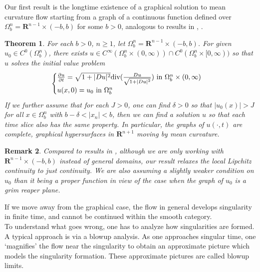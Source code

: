 \documentclass[pdflatex,sn-mathphys-num]{sn-jnl}%
\newtheorem{theorem}{Theorem}[section]
\newtheorem{remark}[theorem]{Remark}
\begin{document}
Our first result is the longtime existence of a graphical solution to mean curvature flow starting from a graph of a continuous function defined over $\Omega^n_b = \mathbf{R}^{n-1}\times (-b,b)$ for some $b > 0$, analogous to results in \cite{eckerhuisken}, \cite{Clutterbuck2005ParabolicEW}.  
\begin{theorem}\label{existence of graphical solution rough statement intro}
   For each $b > 0$, $n \geq 1$, let $\Omega^n_b = \mathbf{R}^{n-1} \times (-b,b)$. For given $u_0 \in C^0(\Omega^n_b)$, there exists $u \in C^{\infty}(\Omega^n_b \times (0, \infty)) \cap C^0(\Omega^n_b \times [0, \infty))$ so that $u$ solves the initial value problem
    \begin{equation}
        \begin{cases}
         \frac{\partial u}{\partial t} = \sqrt{1 + |Du|^2}\textit{\emph{div}}(\frac{Du}{\sqrt{1 + |Du|^2}}) \text{ in }\Omega^n_b \times (0,\infty) \\
         u(x, 0) = u_0 \text{ in }\Omega^n_b
        \end{cases}
    \end{equation}
    If we further assume that for each $J > 0$, one can find $\delta > 0$ so that $|u_0(x)| > J$ for all $x \in \Omega^n_b$ with $b - \delta < |x_n| < b$, then we can find a solution $u$ so that each time slice also has the same property. In particular, the graphs of $u(\cdot, t)$ are complete, graphical hypersurfaces in $\mathbf{R}^{n+1}$ moving by mean curvature.
\end{theorem}
\begin{remark}
    Compared to results in \cite{graphicalmcfoverdomain}, although we are only working with $\mathbf{R}^{n-1}\times (-b,b)$ instead of general domains, our result relaxes the local Lipchitz continuity to just continuity. We are also assuming a slightly weaker condition on $u_0$ than it being a proper function in view of the case when the graph of $u_0$ is a grim reaper plane.
\end{remark}

If we move away from the graphical case,  the flow in general develops singularity in finite time, and cannot be continued within the smooth category. \\

To understand what goes wrong, one has to analyze how singularities are formed. A typical approach is via a blowup analysis. As one approaches singular time, one `magnifies' the flow near the singularity to obtain an approximate picture which models the singularity formation. These approximate pictures are called blowup limits. \\ 
\end{document}
